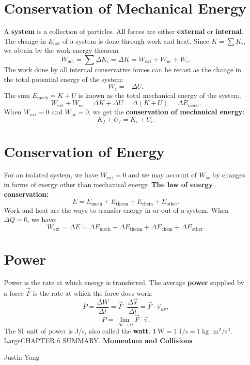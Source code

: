 \documentclass[11pt,a4paper]{report}
\begin{document}
\section{Conservation of Mechanical Energy}
A \textbf{system} is a collection of particles. All forces are either \textbf{external} or \textbf{internal}. The change in $E_\mathrm{net}$ of a system is done through work and heat. Since $K = \sum{K_i}$, we obtain by the work-energy theorem $$W_\mathrm{net} = \sum{\Delta{K_i}} = \Delta{K} = W_\mathrm{ext} + W_\mathrm{nc} + W_\mathrm{c}.$$
The work done by all internal conservative forces can be recast as the change in the total potential energy of the system: $$W_\mathrm{c} = -\Delta{U}.$$
The sum $E_\mathrm{mech} = K + U$ is known as the total mechanical energy of the system, $$W_\mathrm{ext} + W_\mathrm{nc} = \Delta{K} + \Delta{U} = \Delta{\left(K + U\right)} = \Delta{E_\mathrm{mech}}.$$
When $W_\mathrm{ext} = 0$ and $W_\mathrm{nc} = 0$, we get the \textbf{conservation of mechanical energy}: $$K_f + U_f = K_i + U_i.$$

\section{Conservation of Energy}
For an isolated system, we have $W_\mathrm{ext} = 0$ and we may account of $W_\mathrm{nc}$ by changes in forms of energy other than mechanical energy. \textbf{The law of energy conservation:} $$E = E_\mathrm{mech} + E_\mathrm{therm} + E_\mathrm{chem} + E_\mathrm{other}.$$
Work and heat are the ways to transfer energy in or out of a system. When $\Delta{Q} = 0$, we have: $$W_\mathrm{ext} = \Delta{E} = \Delta{E_\mathrm{mech}} + \Delta{E_\mathrm{therm}} + \Delta{E_\mathrm{chem}} + \Delta{E_\mathrm{other}}.$$

\section{Power}
Power is the rate at which energy is transferred. The average \textbf{power} supplied by a force $\vec{F}$ is the rate at which the force does work: $$\bar{P} = \frac{\Delta{W}}{\Delta{t}} = \vec{F} \cdot \frac{\Delta{\vec{x}}}{\Delta{t}} = \vec{F} \cdot \vec{v}_{av},$$ $$P = \lim_{\Delta{t} \to 0} \vec{F} \cdot \vec{v}.$$
The SI unit of power is J/s, also called the \textbf{watt}. $1 \mathrm{\ W} = 1 \mathrm{\ J} / \mathrm{s} = 1 \mathrm{\ kg} \cdot \mathrm{m}^2 / \mathrm{s}^3$.
Large{CHAPTER 6 SUMMARY. \textbf{Momentum and Collisions}}

\large{Justin Yang}
\end{document}
